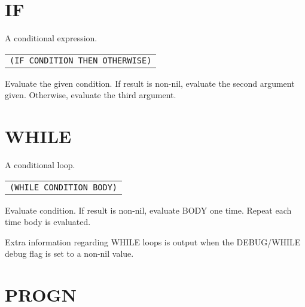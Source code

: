 \documentclass[
letterpaper,
oneside,
]{memoir}
\begin{document}
\vspace{1em}

\section{IF}

\noindent
A conditional expression.

\begin{center}
  \begin{tabular}{c}
    \texttt{(IF CONDITION THEN OTHERWISE)}
  \end{tabular}
\end{center}

\noindent
Evaluate the given condition. If result is non-nil, evaluate the second argument given. Otherwise, evaluate the third argument.

\vspace{1em}

\section{WHILE}

\noindent
A conditional loop.

\begin{center}
  \begin{tabular}{c}
    \texttt{(WHILE CONDITION BODY)}
  \end{tabular}
\end{center}

\noindent
Evaluate condition. If result is non-nil, evaluate BODY one time. Repeat each time body is evaluated.

\vspace{1em}
\noindent
Extra information regarding WHILE loops is output when the DEBUG/WHILE debug flag is set to a non-nil value.

\vspace{1em}

\section{PROGN}
\end{document}
